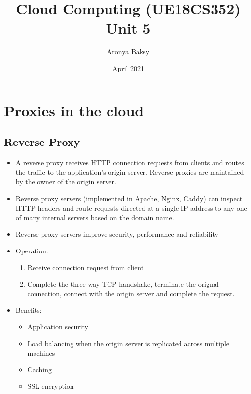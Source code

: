 \documentclass{article}
\title{Cloud Computing (UE18CS352) \\Unit 5}
\author{Aronya Baksy}
\date{April 2021}
\begin{document}
\maketitle
\section{Proxies in the cloud}
\subsection{Reverse Proxy}
\begin{itemize}
    \item A reverse proxy receives HTTP connection requests from clients and routes the traffic to the application's origin server. Reverse proxies are maintained by the owner of the origin server.
    
    \item Reverse proxy servers (implemented in Apache, Nginx, Caddy) can inspect HTTP headers and route requests directed at a single IP address to any one of many internal servers based on the domain name. 
    
    \item Reverse proxy servers improve security, performance and reliability
    
    \item Operation:
    \begin{enumerate}
        \item Receive connection request from client 
        
        \item Complete the three-way TCP handshake, terminate the orignal connection, connect with the origin server and complete the request.
    \end{enumerate}
    
    \item Benefits:
    \begin{itemize}
        \item Application security
        
        \item Load balancing when the origin server is replicated across multiple machines
        
        \item Caching
        
        \item SSL encryption
    \end{itemize}
\end{itemize}
\end{document}
